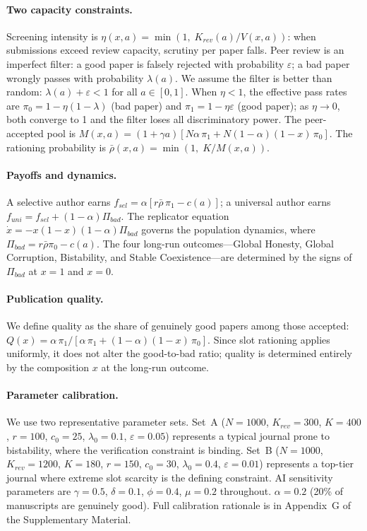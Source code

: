 \documentclass{article}
\begin{document}
\paragraph{Two capacity constraints.}
Screening intensity is $\eta(x,a) = \min(1,\; K_{rev}(a)/V(x,a))$: when submissions exceed review capacity, scrutiny per paper falls.
Peer review is an imperfect filter: a good paper is falsely rejected with probability $\varepsilon$; a bad paper wrongly passes with probability $\lambda(a)$.
We assume the filter is better than random: $\lambda(a) + \varepsilon < 1$ for all $a \in [0,1]$.
When $\eta < 1$, the effective pass rates are $\pi_0 = 1 - \eta(1-\lambda)$ (bad paper) and $\pi_1 = 1 - \eta\varepsilon$ (good paper); as $\eta \to 0$, both converge to 1 and the filter loses all discriminatory power.
The peer-accepted pool is $M(x,a) = (1+\gamma a)[N\alpha\,\pi_1 + N(1-\alpha)(1-x)\,\pi_0]$.
The rationing probability is $\bar{\rho}(x,a) = \min(1,\; K/M(x,a))$.

\paragraph{Payoffs and dynamics.}
A selective author earns $f_{sel} = \alpha[r\bar{\rho}\,\pi_1 - c(a)]$; a universal author earns $f_{uni} = f_{sel} + (1-\alpha)\Pi_{bad}$.
The replicator equation $\dot{x} = -x(1-x)(1-\alpha)\Pi_{bad}$ governs the population dynamics, where $\Pi_{bad} = r\bar{\rho}\pi_0 - c(a)$.
The four long-run outcomes---Global Honesty, Global Corruption, Bistability, and Stable Coexistence---are determined by the signs of $\Pi_{bad}$ at $x=1$ and $x=0$.

\paragraph{Publication quality.}
We define quality as the share of genuinely good papers among those accepted: $Q(x) = \alpha\,\pi_1 / [\alpha\,\pi_1 + (1-\alpha)(1-x)\,\pi_0]$.
Since slot rationing applies uniformly, it does not alter the good-to-bad ratio; quality is determined entirely by the composition $x$ at the long-run outcome.

\paragraph{Parameter calibration.}
We use two representative parameter sets.
Set~A ($N=1000$, $K_{rev}=300$, $K=400$, $r=100$, $c_0=25$, $\lambda_0=0.1$, $\varepsilon=0.05$) represents a typical journal prone to bistability, where the verification constraint is binding.
Set~B ($N=1000$, $K_{rev}=1200$, $K=180$, $r=150$, $c_0=30$, $\lambda_0=0.4$, $\varepsilon=0.01$) represents a top-tier journal where extreme slot scarcity is the defining constraint.
AI sensitivity parameters are $\gamma=0.5$, $\delta=0.1$, $\phi=0.4$, $\mu=0.2$ throughout.
$\alpha = 0.2$ (20\% of manuscripts are genuinely good).
Full calibration rationale is in Appendix~G of the Supplementary Material.
\end{document}
